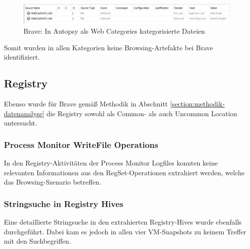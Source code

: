 \begin{appendices}

\begin{figure}[h!]
	\centering
	\includegraphics[width=\textwidth]{bilder/BRCat.png}
	\caption{Brave: In Autopsy als \glqq{}Web Categories\grqq{} kategorisierte Dateien}
	\label{img:brave-web-categories}  
\end{figure}

Somit wurden in allen Kategorien keine Browsing-Artefakte bei Brave identifiziert.

\subsection{Registry}\label{chap:anhang-brave-registry}

Ebenso wurde für Brave gemäß Methodik in Abschnitt \ref{section:methodik-datenanalyse} die Registry sowohl als Common- als auch Uncommon Location untersucht.

\subsubsection*{Process Monitor WriteFile Operations}\label{chap:anhang-brave-common-locations-registry}
In den Registry-Aktivitäten der Process Monitor Logfiles konnten  keine relevanten Informationen aus den RegSet-Operationen extrahiert werden, welche das Browsing-Szenario betreffen.

\subsubsection*{Stringsuche in Registry Hives}\label{chap:anhang-brave-uncommon-locations-registry}
Eine detaillierte Stringsuche in den extrahierten Registry-Hives wurde ebenfalls durchgeführt. Dabei kam es jedoch in allen vier VM-Snapshots zu keinem Treffer mit den Suchbegriffen.

\end{appendices}